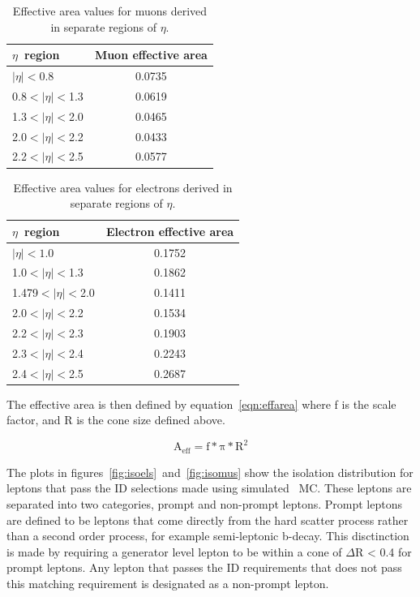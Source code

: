 \begin{table}[htb]
\begin{center}
  \caption{
    \label{tab:eamus}
    Effective area values for muons derived in separate regions of $\eta$.
  }
\begin{tabular}{l|c}
\hline
\hline
$\eta$~region        & Muon effective area \\
\hline
$|\eta| < 0.8$       & 0.0735 \\
0.8$ < |\eta| < $1.3 & 0.0619 \\
1.3$ < |\eta| < $2.0 & 0.0465 \\
2.0$ < |\eta| < $2.2 & 0.0433 \\
2.2$ < |\eta| < $2.5 & 0.0577 \\
\hline
\hline
\end{tabular}
\end{center}
\end{table}

\begin{table}[htb]
\begin{center}
  \caption{
    \label{tab:eaels}
    Effective area values for electrons derived in separate regions of $\eta$.
  }
\begin{tabular}{l|c}
\hline
\hline
$\eta$~region          & Electron effective area \\
\hline
$|\eta| < 1.0$         & 0.1752 \\
1.0$ < |\eta| < $1.3   & 0.1862 \\
1.479$ < |\eta| < $2.0 & 0.1411 \\
2.0$ < |\eta| < $2.2   & 0.1534 \\
2.2$ < |\eta| < $2.3   & 0.1903 \\
2.3$ < |\eta| < $2.4   & 0.2243 \\
2.4$ < |\eta| < $2.5   & 0.2687 \\
\hline
\hline
\end{tabular}
\end{center}
\end{table}

The effective area is then defined by equation~\ref{eqn:effarea} where f is the scale factor, and R is the cone size defined above.

\begin{equation}
\label{eqn:effarea}
\mathrm{A_{eff} = f*\pi * R^2}
\end{equation}

The plots in figures~\ref{fig:isoels}~and~\ref{fig:isomus}
show the isolation distribution for leptons that pass the ID selections made using simulated \zjets\ MC.
These leptons are separated into two categories, prompt and non-prompt leptons.
Prompt leptons are defined to be leptons that come directly from the hard scatter process rather than a second order process, for example semi-leptonic b-decay.
This disctinction is made by requiring a generator level lepton to be within a cone of $\Delta$R < 0.4 for prompt leptons.
Any lepton that passes the ID requirements that does not pass this matching requirement is designated as a non-prompt lepton.

